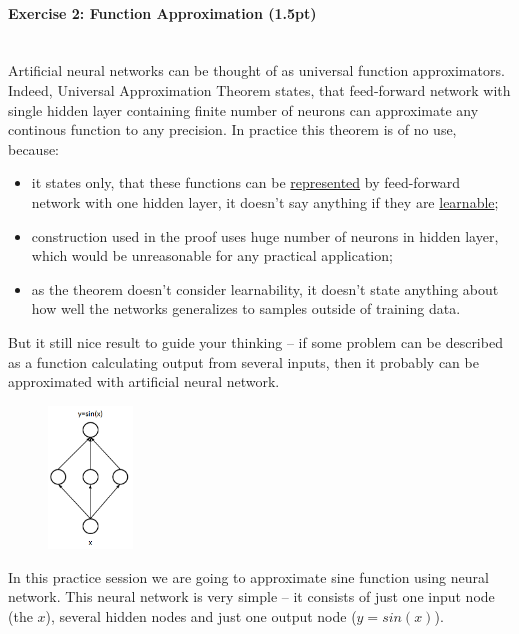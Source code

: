 \documentclass[a4paper,11pt]{article}
\newenvironment{exercise}[3]{\paragraph{Exercise #1: #2 (#3pt)}\ \\}{
\medskip}
\begin{document}
%
%
\begin{exercise}{2}{Function Approximation}{1.5}

Artificial neural networks can be thought of as universal function approximators. Indeed, Universal Approximation Theorem states, that feed-forward network with single hidden layer containing finite number of neurons can approximate any continous function to any precision. In practice this theorem is of no use, because:
\begin{itemize}
  \item it states only, that these functions can be \uline{represented} by feed-forward network with one hidden layer, it doesn’t say anything if they are \uline{learnable};
  \item construction used in the proof uses huge number of neurons in hidden layer, which would be unreasonable for any practical application;
  \item as the theorem doesn’t consider learnability, it doesn’t state anything about how well the networks generalizes to samples outside of training data.
\end{itemize}

But it still nice result to guide your thinking – if some problem can be described as a function calculating output from several inputs, then it probably can be approximated with artificial neural network.\newline

\begin{figure}
	\centering
	\vspace{-12pt}
	\includegraphics[width=0.20\textwidth]{sine.png}
	\label{fig:sineexample}
	\vspace{-5pt}
\end{figure}

In this practice session we are going to approximate sine function using neural network. This neural network is very simple – it consists of just one input node (the $x$), several hidden nodes and just one output node ($y = sin(x)$).


\end{exercise}
\end{document}
